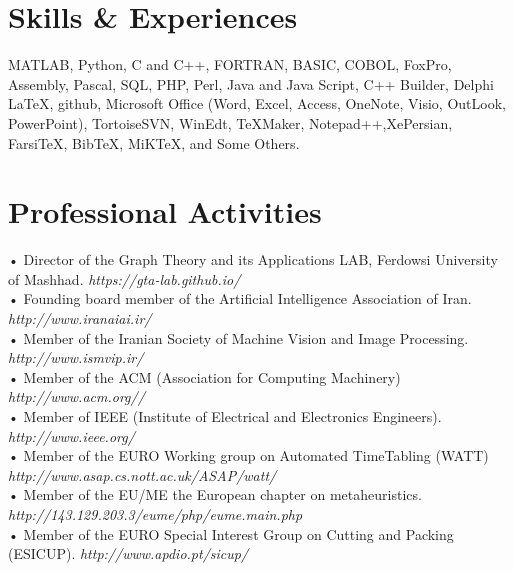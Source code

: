 \documentclass[10pt,a4paper]{moderncv}
\begin{document}
\section{Skills \& Experiences}
{MATLAB, Python, C and C++,  FORTRAN, BASIC, COBOL, FoxPro,  Assembly, Pascal, SQL, PHP, Perl, Java and Java Script, C++ Builder, Delphi} {}{}{}{}
{ \LaTeX, github, Microsoft Office (Word, Excel, Access, OneNote, Visio,
 OutLook, PowerPoint), TortoiseSVN, WinEdt, TeXMaker, Notepad++,XePersian,
 Farsi\TeX, Bib\TeX, MiKTeX, and Some Others.} {}{}{}{} %

\newpage
\section{Professional Activities}
{\small • Director of the Graph Theory and its Applications LAB, Ferdowsi University of Mashhad. \hfill {\scriptsize\em https://gta-lab.github.io/}}\\
{\small • Founding board member of the Artificial Intelligence Association of Iran. \hfill {\scriptsize\em http://www.iranaiai.ir/}}\\
{\small • Member of the Iranian Society of Machine Vision and Image Processing. \hfill {\scriptsize\em http://www.ismvip.ir/}}\\
{\small • Member of the ACM (Association for Computing Machinery) \hfill {\scriptsize\em http://www.acm.org//}}\\
{\small • Member of IEEE (Institute of Electrical and Electronics Engineers). \hfill {\scriptsize\em http://www.ieee.org/}}\\
{\small • Member of the EURO Working group on Automated TimeTabling (WATT) \hfill {\scriptsize\em http://www.asap.cs.nott.ac.uk/ASAP/watt/}}\\
{\small • Member of the EU/ME the European chapter on metaheuristics. \hfill {\scriptsize\em http://143.129.203.3/eume/php/eume.main.php}}\\
{\small • Member of the EURO Special Interest Group on Cutting and Packing (ESICUP). \hfill {\scriptsize\em http://www.apdio.pt/sicup/}}
\end{document}
